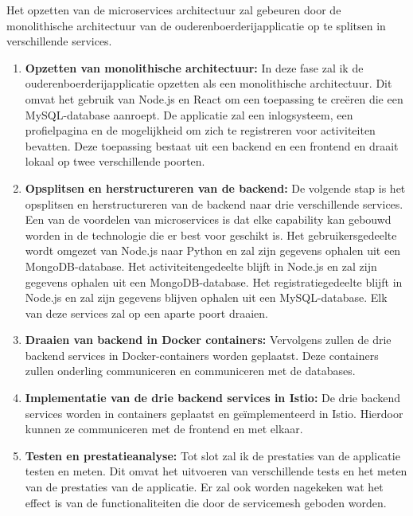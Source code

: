 Het opzetten van de microservices architectuur zal gebeuren door de monolithische architectuur van de ouderenboerderijapplicatie op te splitsen in verschillende services. 
\begin{enumerate}
	\item \textbf{Opzetten van monolithische architectuur:} In deze fase zal ik de ouderenboerderijapplicatie opzetten als een monolithische architectuur. Dit omvat het gebruik van Node.js en React om een toepassing te creëren die een MySQL-database aanroept. De applicatie zal een inlogsysteem, een profielpagina en de mogelijkheid om zich te registreren voor activiteiten bevatten. Deze toepassing bestaat uit een backend en een frontend en draait lokaal op twee verschillende poorten.
	\item \textbf{Opsplitsen en herstructureren van de backend:} De volgende stap is het opsplitsen en herstructureren van de backend naar drie verschillende services. Een van de voordelen van microservices is dat elke capability kan gebouwd worden in de technologie die er best voor geschikt is. Het gebruikersgedeelte wordt omgezet van Node.js naar Python en zal zijn gegevens ophalen uit een MongoDB-database. Het activiteitengedeelte blijft in Node.js en zal zijn gegevens ophalen uit een MongoDB-database. Het registratiegedeelte blijft in Node.js en zal zijn gegevens blijven ophalen uit een MySQL-database. Elk van deze services zal op een aparte poort draaien.
	\item \textbf{Draaien van backend in Docker containers:} Vervolgens zullen de drie backend services in Docker-containers worden geplaatst. Deze containers zullen onderling communiceren en communiceren met de databases.
	\item \textbf{Implementatie van de drie backend services in Istio:} De drie backend services worden in containers geplaatst en geïmplementeerd in Istio. Hierdoor kunnen ze communiceren met de frontend en met elkaar.
	\item \textbf{Testen en prestatieanalyse:} Tot slot zal ik de prestaties van de applicatie testen en meten. Dit omvat het uitvoeren van verschillende tests en het meten van de prestaties van de applicatie. Er zal ook worden nagekeken wat het effect is van de functionaliteiten die door de servicemesh geboden worden.
\end{enumerate}


